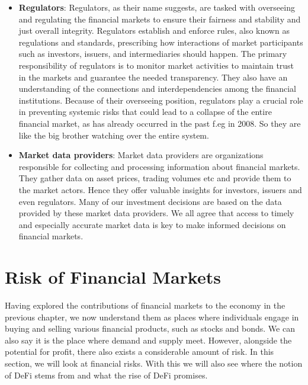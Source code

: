 \documentclass{article}
\begin{document}
\begin{itemize}
\item \textbf{Regulators}:
Regulators, as their name suggests, are tasked with overseeing and regulating the financial markets to ensure their fairness and stability and just overall integrity. Regulators establish and enforce rules, also known as regulations and standards, prescribing how interactions of market participants such as investors, issuers, and intermediaries should happen. The primary responsibility of regulators is to monitor market activities to maintain trust in the markets and guarantee the needed transparency. They also have an understanding of the connections and interdependencies among the financial institutions. Because of their overseeing position, regulators play a crucial role in preventing systemic risks that could lead to a collapse of the entire financial market, as has already occurred in the past f.eg in 2008. So they are like the big brother watching over the entire system.

\item \textbf{Market data providers}:
Market data providers are organizations responsible for collecting and processing information about financial markets. They gather data on asset prices, trading volumes etc and provide them to the market actors. Hence they offer valuable insights for investors,  issuers and even regulators. Many of our investment decisions are based on the data provided by these market data providers. We all agree that access to timely and especially accurate market data is key to make informed decisions on financial markets.
\end{itemize}

\section{Risk of Financial Markets}
Having explored the contributions of financial markets to the economy in the previous chapter, we now understand them as places where individuals engage in buying and selling various financial products, such as stocks and bonds. We can also say it is  the place where demand and supply meet. However, alongside the potential for profit, there also exists a considerable amount of risk. In this section, we will look at financial risks. With this we will also see where the notion of DeFi stems from and what the rise of DeFi promises.
\end{document}

